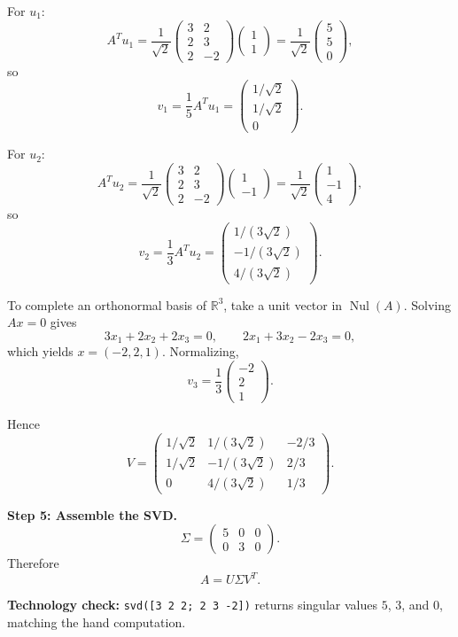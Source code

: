 \begin{solution}
For $u_1$:
\[
A^Tu_1
=
\frac{1}{\sqrt{2}}
\begin{pmatrix}
3&2\\
2&3\\
2&-2
\end{pmatrix}
\begin{pmatrix}
1\\
1
\end{pmatrix}
=
\frac{1}{\sqrt{2}}
\begin{pmatrix}
5\\
5\\
0
\end{pmatrix},
\]
so
\[
v_1=\frac{1}{5}A^Tu_1
=
\begin{pmatrix}
1/\sqrt{2}\\
1/\sqrt{2}\\
0
\end{pmatrix}.
\]

For $u_2$:
\[
A^Tu_2
=
\frac{1}{\sqrt{2}}
\begin{pmatrix}
3&2\\
2&3\\
2&-2
\end{pmatrix}
\begin{pmatrix}
1\\
-1
\end{pmatrix}
=
\frac{1}{\sqrt{2}}
\begin{pmatrix}
1\\
-1\\
4
\end{pmatrix},
\]
so
\[
v_2=\frac{1}{3}A^Tu_2
=
\begin{pmatrix}
1/(3\sqrt{2})\\
-1/(3\sqrt{2})\\
4/(3\sqrt{2})
\end{pmatrix}.
\]

To complete an orthonormal basis of $\mathbb{R}^3$, take a unit vector in $\operatorname{Nul}(A)$. Solving $Ax=0$ gives
\[
3x_1+2x_2+2x_3=0,\qquad
2x_1+3x_2-2x_3=0,
\]
which yields $x=(-2,2,1)$. Normalizing,
\[
v_3=\frac{1}{3}\begin{pmatrix}-2\\2\\1\end{pmatrix}.
\]

Hence
\[
V=
\begin{pmatrix}
1/\sqrt{2} & 1/(3\sqrt{2}) & -2/3\\
1/\sqrt{2} & -1/(3\sqrt{2}) & 2/3\\
0 & 4/(3\sqrt{2}) & 1/3
\end{pmatrix}.
\]

\textbf{Step 5: Assemble the SVD.}
\[
\Sigma=
\begin{pmatrix}
5&0&0\\
0&3&0
\end{pmatrix}.
\]
Therefore
\[
\boxed{
A=U\Sigma V^T.
}
\]

\textbf{Technology check:} \texttt{svd([3 2 2; 2 3 -2])} returns singular values $5$, $3$, and $0$, matching the hand computation.
\end{solution}

